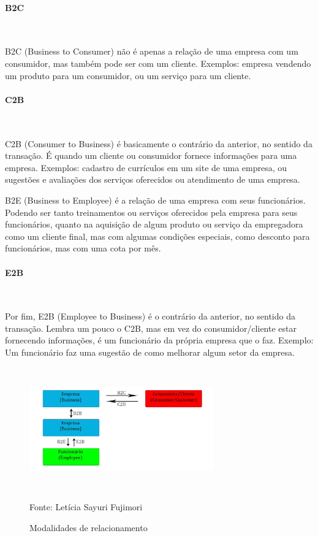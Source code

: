 \paragraph{B2C}\mbox{}\\
\par
B2C (Business to Consumer) não é apenas a relação de uma empresa com um consumidor, mas também pode ser com um cliente. Exemplos: empresa vendendo um produto para um consumidor, ou um serviço para um cliente.

\paragraph{C2B}\mbox{}\\
\par
C2B (Consumer to Business) é basicamente o contrário da anterior, no sentido da transação. É quando um cliente ou consumidor fornece informações para uma empresa. Exemplos: cadastro de currículos em um site de uma empresa, ou sugestões e avaliações dos serviços oferecidos ou atendimento de uma empresa.


\par
B2E (Business to Employee) é a relação de uma empresa com seus funcionários. Podendo ser tanto treinamentos ou serviços oferecidos pela empresa para seus funcionários, quanto na aquisição de algum produto ou serviço da empregadora como um cliente final, mas com algumas condições especiais, como desconto para funcionários, mas com uma cota por mês.

\paragraph{E2B}\mbox{}\\
\par
Por fim, E2B (Employee to Business) é o contrário da anterior, no sentido da transação. Lembra um pouco o C2B, mas em vez do consumidor/cliente estar fornecendo informações, é um funcionário da própria empresa que o faz. Exemplo: Um funcionário faz uma sugestão de como melhorar algum setor da empresa.
 \begin{figure}[!h]
	\centering
	\caption{Modalidades de relacionamento}
	\includegraphics[width=300px, height=200px]{./images/2-7.jpg}
	\par{Fonte: Letícia Sayuri Fujimori}
\end{figure}

